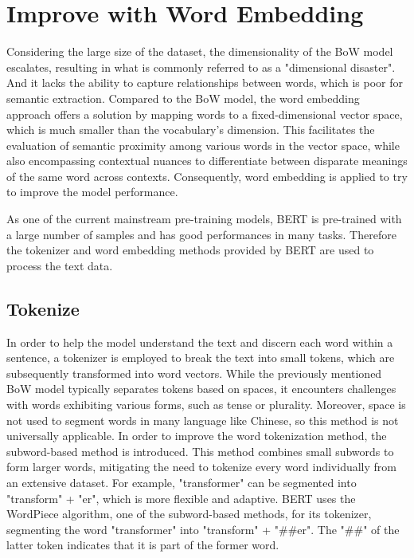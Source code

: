 \documentclass[ %
                    author={Louis Wang},
                supervisor={Dr. Qiang Liu},
                    degree={MSc},
                     title={Identification of Suicide Ideation in Texts},
                      type={},
                      year={2024}]{dissertation}
\begin{document}
\section{Improve with Word Embedding}
\noindent
Considering the large size of the dataset, the dimensionality of the BoW model escalates, resulting in what is commonly referred to as a "dimensional disaster". And it lacks the ability to capture relationships between words, which is poor for semantic extraction. Compared to the BoW model, the word embedding approach offers a solution by mapping words to a fixed-dimensional vector space, which is much smaller than the vocabulary's dimension. This facilitates the evaluation of semantic proximity among various words in the vector space, while also encompassing contextual nuances to differentiate between disparate meanings of the same word across contexts. Consequently, word embedding is applied to try to improve the model performance.

As one of the current mainstream pre-training models, BERT is pre-trained with a large number of samples and has good performances in many tasks. Therefore the tokenizer and word embedding methods provided by BERT are used to process the text data.

\subsection{Tokenize}
\noindent
In order to help the model understand the text and discern each word within a sentence, a tokenizer is employed to break the text into small tokens, which are subsequently transformed into word vectors. While the previously mentioned BoW model typically separates tokens based on spaces, it encounters challenges with words exhibiting various forms, such as tense or plurality. Moreover, space is not used to segment words in many language like Chinese, so this method is not universally applicable. In order to improve the word tokenization method, the subword-based method is introduced. This method combines small subwords to form larger words, mitigating the need to tokenize every word individually from an extensive dataset. For example, "transformer" can be segmented into "transform" + "er", which is more flexible and adaptive. BERT uses the WordPiece algorithm\cite{wu2016google}, one of the subword-based methods, for its tokenizer, segmenting the word "transformer" into "transform" + "\#\#er". The "\#\#" of the latter token indicates that it is part of the former word.
\end{document}
